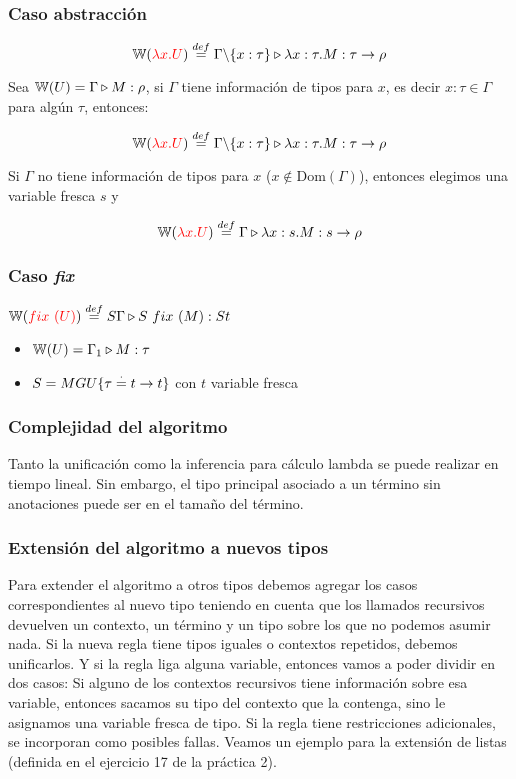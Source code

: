 \subsubsection{Caso abstracción}
$$\mathbb{W}({\color{red}\lambda x. U}) \overset{def}{=} \Gamma \backslash\{x:\tau\}\triangleright \lambda x: \tau . M : \tau\to\rho$$


Sea $\mathbb{W}(U) = \Gamma\triangleright M : \rho$, si $\Gamma$ tiene información de tipos para $x$, es decir $x:\tau\in\Gamma$ para algún $\tau$, entonces:

$$\mathbb{W}({\color{red}\lambda x. U}) \overset{def}{=} \Gamma \backslash\{x:\tau\}\triangleright \lambda x: \tau . M : \tau\to\rho$$

Si $\Gamma$ no tiene información de tipos para $x$ ($x\notin \text{Dom}(\Gamma)$), entonces elegimos una variable fresca $s$ y

$$\mathbb{W}({\color{red}\lambda x. U}) \overset{def}{=} \Gamma\triangleright \lambda x: s . M : s\to\rho$$

\subsubsection{Caso \textit{fix}}
$\mathbb{W}({\color{red}fix~(U)}) \overset{def}{=} S\Gamma\triangleright S~fix~(M) : St$
\begin{centrado}
	\begin{itemize}
		\item $\mathbb{W}(U) = \Gamma_1\triangleright M : \tau$
		\item $S = MGU\{\tau\overset{\cdot}{=} t\to t\}$ con $t$ variable fresca
	\end{itemize}
\end{centrado}

\subsubsection{Complejidad del algoritmo}
Tanto la unificación como la inferencia para cálculo lambda se puede realizar en tiempo lineal. Sin embargo, el tipo principal asociado a un término sin anotaciones puede ser  en el tamaño del término.

\subsubsection{Extensión del algoritmo a nuevos tipos}
Para extender el algoritmo a otros tipos debemos agregar los casos correspondientes al nuevo tipo teniendo en cuenta que los llamados recursivos devuelven un contexto, un término y un tipo sobre los que no podemos asumir nada.
Si la nueva regla tiene tipos iguales o contextos repetidos, debemos unificarlos. Y si la regla liga alguna variable, entonces vamos a poder dividir en dos casos: 
Si alguno de los contextos recursivos tiene información sobre esa variable, entonces sacamos su tipo del contexto que la contenga, sino le asignamos una variable fresca de tipo. Si la regla tiene restricciones adicionales, se incorporan como posibles fallas. Veamos un ejemplo para la extensión de listas (definida en el ejercicio 17 de la práctica 2).


